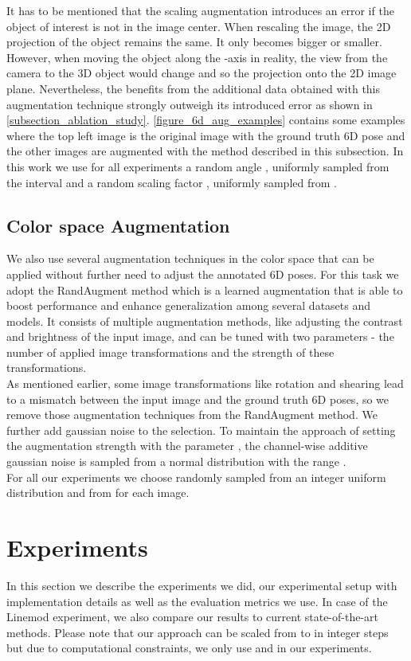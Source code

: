 \documentclass[twocolumn, 10pt, letterpaper]{article}
\begin{document}
It has to be mentioned that the scaling augmentation introduces an error if the object of interest is not in the image center. When rescaling the image, the 2D projection of the object remains the same. It only becomes bigger or smaller. However, when moving the object along the -axis in reality, the view from the camera to the 3D object would change and so the projection onto the 2D image plane. Nevertheless, the benefits from the additional data obtained with this augmentation technique strongly outweigh its introduced error as shown in \autoref{subsection_ablation_study}. \autoref{figure_6d_aug_examples} contains some examples where the top left image is the original image with the ground truth 6D pose and the other images are augmented with the method described in this subsection. In this work we use for all experiments a random angle , uniformly sampled from the interval  and a random scaling factor , uniformly sampled from .

\subsection{Color space Augmentation}
\label{subsection_colorspace_augmentation}
We also use several augmentation techniques in the color space that can be applied without further need to adjust the annotated 6D poses. For this task we adopt the RandAugment\cite{RandAugment} method which is a learned augmentation that is able to boost performance and enhance generalization among several datasets and models. It consists of multiple augmentation methods, like adjusting the contrast and brightness of the input image, and can be tuned with two parameters - the number  of applied image transformations and the strength  of these transformations.\\
As mentioned earlier, some image transformations like rotation and shearing lead to a mismatch between the input image and the ground truth 6D poses, so we remove those augmentation techniques from the RandAugment method. We further add gaussian noise to the selection. To maintain the approach of setting the augmentation strength with the parameter , the channel-wise additive gaussian noise is sampled from a normal distribution with the range .\\
For all our experiments we choose  randomly sampled from an integer uniform distribution  and  from  for each image.

\section{Experiments}
\label{section_experiments}
In this section we describe the experiments we did, our experimental setup with implementation details as well as the evaluation metrics we use. In case of the Linemod experiment, we also compare our results to current state-of-the-art methods. Please note that our approach can be scaled from  to  in integer steps but due to computational constraints, we only use  and  in our experiments.
\end{document}
